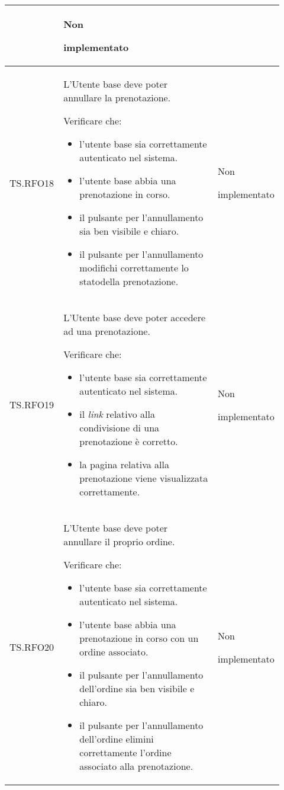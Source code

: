 \begin{longtable}{|p{0.10\linewidth}|p{0.70\linewidth}|p{0.12\linewidth}|}
\begin{itemize}
    \end{itemize}&
    Non \par implementato  \\
    \hline
    TS.RFO18 & 
    L’Utente base deve poter annullare la prenotazione.  \par 
    Verificare che: 
    \begin{itemize}
        \item l'utente base sia correttamente autenticato nel sistema.
        \item l'utente base abbia una prenotazione in corso.
        \item il pulsante per l'annullamento sia ben visibile e chiaro.
        \item il pulsante per l'annullamento modifichi correttamente lo stato\g della prenotazione.
    \end{itemize}&
    Non \par implementato  \\
    \hline
    TS.RFO19 & 
    L’Utente base deve poter accedere ad una prenotazione.  \par 
    Verificare che: 
    \begin{itemize}
        \item l'utente base sia correttamente autenticato nel sistema.
        \item il \textit{link} relativo alla condivisione di una prenotazione è corretto.
        \item la pagina relativa alla prenotazione viene visualizzata correttamente.
    \end{itemize}&
    Non \par implementato  \\
    \hline
    TS.RFO20 & 
    L’Utente base deve poter annullare il proprio ordine\g.\par 
    Verificare che: 
    \begin{itemize}
        \item l'utente base sia correttamente autenticato nel sistema.
        \item l'utente base abbia una prenotazione in corso con un ordine associato.
        \item il pulsante per l'annullamento dell'ordine sia ben visibile e chiaro.
        \item il pulsante per l'annullamento dell'ordine elimini correttamente l'ordine associato alla prenotazione.
    \end{itemize}&
    Non \par implementato  \\

\end{longtable}

